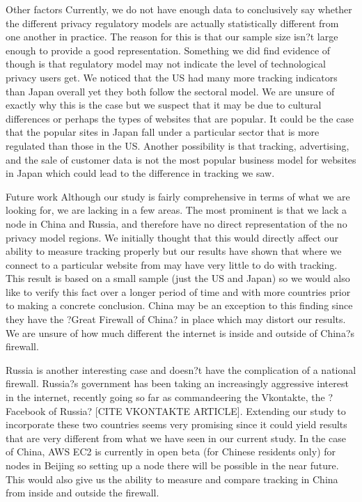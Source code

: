 \documentclass[journal]{IEEEtran}
\begin{document}
Other factors 
Currently, we do not have enough data to conclusively say whether the different privacy regulatory models are actually statistically different from one another in practice. The reason for this is that our sample size isn?t large enough to provide a good representation. Something we did find evidence of though is that regulatory model may not indicate the level of technological privacy users get. We noticed that the US had many more tracking indicators than Japan overall yet they both follow the sectoral model. We are unsure of exactly why this is the case but we suspect that it may be due to cultural differences or perhaps the types of websites that are popular. It could be the case that the popular sites in Japan fall under a particular sector that is more regulated than those in the US. Another possibility is that tracking, advertising, and the sale of customer data is not the most popular business model for websites in Japan which could lead to the difference in tracking we saw.

Future work
Although our study is fairly comprehensive in terms of what we are looking for, we are lacking in a few areas. The most prominent is that we lack a node in China and Russia, and therefore have no direct representation of the no privacy model regions. We initially thought that this would directly affect our ability to measure tracking properly but our results have shown that where we connect to a particular website from may have very little to do with tracking. This result is based on a small sample (just the US and Japan) so we would also like to verify this fact over a longer period of time and with more countries prior to making a concrete conclusion. China may be an exception to this finding since they have the ?Great Firewall of China? in place which may distort our results. We are unsure of how much different the internet is inside and outside of China?s firewall. 

Russia is another interesting case and doesn?t have the complication of a national firewall. Russia?s government has been taking an increasingly aggressive interest in the internet, recently going so far as commandeering the Vkontakte, the ?Facebook of Russia? [CITE VKONTAKTE ARTICLE]. Extending our study to incorporate these two countries seems very promising since it could yield results that are very different from what we have seen in our current study. In the case of China, AWS EC2 is currently in open beta (for Chinese residents only) for nodes in Beijing so setting up a node there will be possible in the near future. This would also give us the ability to measure and compare tracking in China from inside and outside the firewall.
\end{document}
